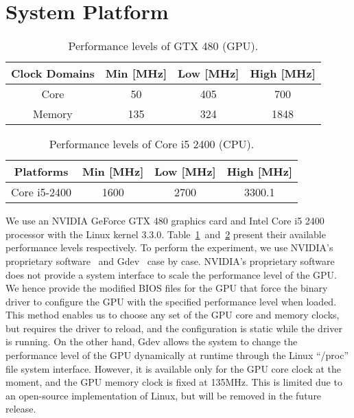 \section{System Platform}
\label{sec:platform}

\begin{table}[!t]
 \caption{Performance levels of GTX 480 (GPU).}
 \vspace{-2.0mm}
 \label{tab:GPU-frequency}
 \footnotesize
 \begin{center}
  \begin{tabular}{|c|c|c|c|}
   \hline
   Clock Domains &Min [MHz]&Low [MHz] & High [MHz]\\
   \hline
   \hline
    Core & 50 & 405 & 700\\
    \hline
    Memory & 135 & 324 & 1848\\
   \hline
  \end{tabular}
  \vspace{-5.0mm}
 \end{center}
\end{table}

\begin{table}[!t]
 \caption{Performance levels of Core i5 2400 (CPU).}
 \small
 \label{tab:CPU-frequency}
 \begin{center}
  \begin{tabular}{|c|c|c|c|}
   \hline
   Platforms&Min [MHz]&Low [MHz]&High [MHz]\\
   \hline
   \hline
   Core i5-2400 &1600& 2700 & 3300.1\\
   \hline
  \end{tabular}
 \end{center}
 \end{table}

We use an NVIDIA GeForce GTX 480 graphics card and Intel Core i5 2400
processor with the Linux kernel 3.3.0.
Table~\ref{tab:GPU-frequency}~and~\ref{tab:CPU-frequency} present their
available performance levels respectively.
To perform the experiment, we use NVIDIA's proprietary
software~\cite{BLOB} and Gdev~\cite{Kato2012} case by case.
NVIDIA's proprietary software does not provide a system interface to
scale the performance level of the GPU.
We hence provide the modified BIOS files for the GPU that force the
binary driver to configure the GPU with the specified performance level
when loaded.
This method enables us to choose any set of the GPU core and memory
clocks, but requires the driver to reload, and the configuration is
static while the driver is running.
On the other hand, Gdev allows the system to change the performance
level of the GPU dynamically at runtime through the Linux ``/proc'' file
system interface.
However, it is available only for the GPU core clock at the moment, and
the GPU memory clock is fixed at 135MHz.
This is limited due to an open-source implementation of Linux, but will
be removed in the future release.

